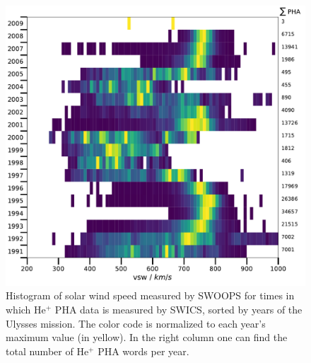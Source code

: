 \begin{figure}[h]
	\includegraphics[width=1\textwidth]{Figures/vsw_sum.pdf}
	\centering
	\caption{Histogram of solar wind speed measured by SWOOPS for times in which $\mathrm{He^{+}}$ PHA data is measured by SWICS, sorted by years of the Ulysses mission. The color code is normalized to each year's maximum value (in yellow). In the right column one can find the total number of $\mathrm{He^{+}}$ PHA words per year. }
	\label{fig:vsw_years}
\end{figure}


%
